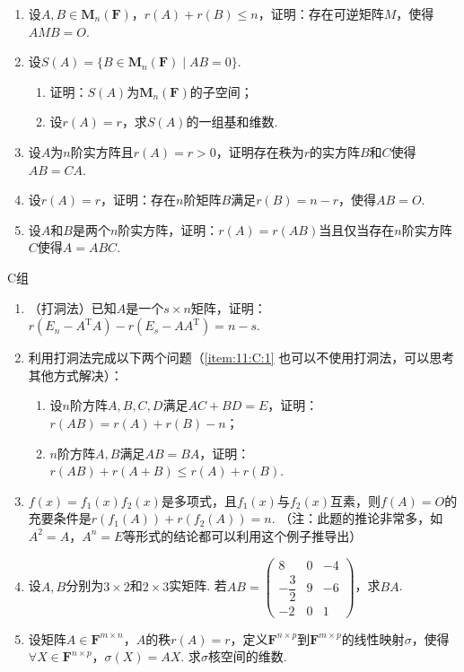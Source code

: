 \begin{enumerate}
    \item 设$A,B \in \mathbf{M}_n(\mathbf{F})$，$r(A)+r(B) \leqslant n$，证明：存在可逆矩阵$M$，使得$AMB=O$.

    \item 设$S(A)=\{B \in \mathbf{M}_n(\mathbf{F}) \mid AB=0\}$.
          \begin{enumerate}
              \item 证明：$S(A)$为$\mathbf{M}_n(\mathbf{F})$的子空间；

              \item 设$r(A)=r$，求$S(A)$的一组基和维数.
          \end{enumerate}

    \item 设$A$为$n$阶实方阵且$r(A)=r>0$，证明存在秩为$r$的实方阵$B$和$C$使得$AB=CA$. %

    \item 设$r(A)=r$，证明：存在$n$阶矩阵$B$满足$r(B)=n-r$，使得$AB=O$. %

    \item 设$A$和$B$是两个$n$阶实方阵，证明：$r(A)=r(AB)$当且仅当存在$n$阶实方阵$C$使得$A=ABC$. %
\end{enumerate}

\centerline{\heiti C组}
\begin{enumerate}
    \item （打洞法）已知$A$是一个$s \times n$矩阵，证明：$r(E_n-A^\mathrm{T}A)-r(E_s-AA^\mathrm{T})=n-s$.

    \item 利用打洞法完成以下两个问题（\ref*{item:11:C:1} 也可以不使用打洞法，可以思考其他方式解决）：
          \begin{enumerate}
              \item 设$n$阶方阵$A,B,C,D$满足$AC+BD=E$，证明：$r(AB) = r(A)+r(B)-n$；

              \item \label{item:11:C:1}
                    $n$阶方阵$A,B$满足$AB=BA$，证明：$r(AB)+r(A+B)\leqslant r(A)+r(B)$.
          \end{enumerate}

    \item $f(x)=f_1(x)f_2(x)$是多项式，且$f_1(x)$与$f_2(x)$互素，则$f(A)=O$的充要条件是$r(f_1(A))+r(f_2(A))=n$. （注：此题的推论非常多，如$A^2=A$，$A^n=E$等形式的结论都可以利用这个例子推导出）

    \item 设$A,B$分别为$3 \times 2$和$2 \times 3$实矩阵. 若$AB=\begin{pmatrix}
                  8             & 0 & -4 \\[1ex]
                  -\dfrac{3}{2} & 9 & -6 \\[1ex]
                  -2            & 0 & 1
              \end{pmatrix}$，求$BA$.

    \item 设矩阵$A \in \mathbf{F}^{m \times n}$，$A$的秩$r(A)=r$，定义$\mathbf{F}^{n \times p}$到$\mathbf{F}^{m \times p}$的线性映射$\sigma$，使得$\forall X \in \mathbf{F}^{n \times p}$，$\sigma(X)=AX$. 求$\sigma$核空间的维数.
\end{enumerate}
